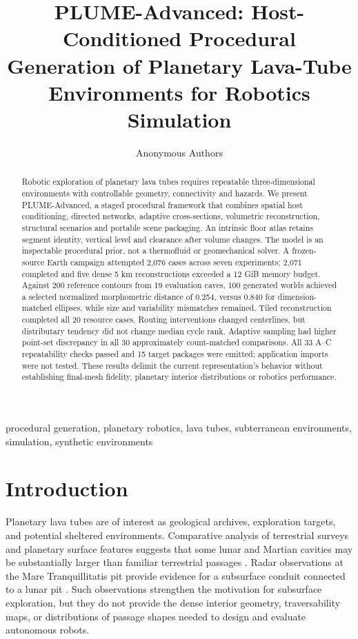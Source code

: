 \documentclass[conference]{IEEEtran}
\begin{document}
\title{PLUME-Advanced: Host-Conditioned Procedural Generation of Planetary Lava-Tube Environments for Robotics Simulation}
\author{Anonymous Authors}
\maketitle

\begin{abstract}
Robotic exploration of planetary lava tubes requires repeatable three-dimensional environments with controllable geometry, connectivity and hazards. We present PLUME-Advanced, a staged procedural framework that combines spatial host conditioning, directed networks, adaptive cross-sections, volumetric reconstruction, structural scenarios and portable scene packaging. An intrinsic floor atlas retains segment identity, vertical level and clearance after volume changes. The model is an inspectable procedural prior, not a thermofluid or geomechanical solver. A frozen-source Earth campaign attempted 2,076 cases across seven experiments; 2,071 completed and five dense 5 km reconstructions exceeded a 12 GiB memory budget. Against 200 reference contours from 19 evaluation caves, 100 generated worlds achieved a selected normalized morphometric distance of 0.254, versus 0.840 for dimension-matched ellipses, while size and variability mismatches remained. Tiled reconstruction completed all 20 resource cases. Routing interventions changed centerlines, but distributary tendency did not change median cycle rank. Adaptive sampling had higher point-set discrepancy in all 30 approximately count-matched comparisons. All 33 A--C repeatability checks passed and 15 target packages were emitted; application imports were not tested. These results delimit the current representation's behavior without establishing final-mesh fidelity, planetary interior distributions or robotics performance.
\end{abstract}

\begin{IEEEkeywords}
procedural generation, planetary robotics, lava tubes, subterranean environments, simulation, synthetic environments
\end{IEEEkeywords}

\section{Introduction}
Planetary lava tubes are of interest as geological archives, exploration targets, and potential sheltered environments. Comparative analysis of terrestrial surveys and planetary surface features suggests that some lunar and Martian cavities may be substantially larger than familiar terrestrial passages \cite{sauro2020}. Radar observations at the Mare Tranquillitatis pit provide evidence for a subsurface conduit connected to a lunar pit \cite{carrer2024}. Such observations strengthen the motivation for subsurface exploration, but they do not provide the dense interior geometry, traversability maps, or distributions of passage shapes needed to design and evaluate autonomous robots.
\end{document}
